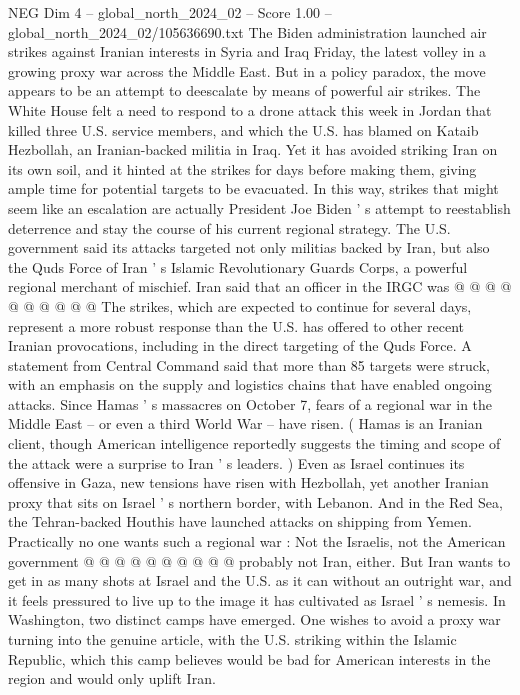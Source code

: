 \begin{textsample}{NEG Dim 4 – global\_north\_2024\_02 – Score 1.00 – global\_north\_2024\_02/105636690.txt}  \label{ex:f4_neg_287}
The Biden administration launched air strikes against Iranian interests in Syria and Iraq Friday, the latest volley in a growing proxy war across the Middle East.
But in a policy paradox, the move appears to be an attempt to deescalate by means of powerful air strikes.
The White House felt a need to respond to a drone attack this week in Jordan that killed three U.S. service members, and which the U.S. has blamed on Kataib Hezbollah, an Iranian-backed militia in Iraq.
Yet it has avoided striking Iran on its own soil, and it hinted at the strikes for days before making them, giving ample time for potential targets to be evacuated.
In this way, strikes that might seem like an escalation are actually President Joe Biden ' s attempt to reestablish deterrence and stay the course of his current regional strategy.
The U.S. government said its attacks targeted not only militias backed by Iran, but also the Quds Force of Iran ' s Islamic Revolutionary Guards Corps, a powerful regional merchant of mischief.
Iran said that an officer in the IRGC was @ @ @ @ @ @ @ @ @ @ The strikes, which are expected to continue for several days, represent a more robust response than the U.S. has offered to other recent Iranian provocations, including in the direct targeting of the Quds Force.
A statement from Central Command said that more than 85 targets were struck, with an emphasis on the supply and logistics chains that have enabled ongoing attacks.
Since Hamas ' s massacres on October 7, fears of a regional war in the Middle East -- or even a third World War -- have risen. ( Hamas is an Iranian client, though American intelligence reportedly suggests the timing and scope of the attack were a surprise to Iran ' s leaders. ) Even as Israel continues its offensive in Gaza, new tensions have risen with Hezbollah, yet another Iranian proxy that sits on Israel ' s northern border, with Lebanon.
And in the Red Sea, the Tehran-backed Houthis have launched attacks on shipping from Yemen.
Practically no one wants such a regional war : Not the Israelis, not the American government @ @ @ @ @ @ @ @ @ @ probably not Iran, either.
But Iran wants to get in as many shots at Israel and the U.S. as it can without an outright war, and it feels pressured to live up to the image it has cultivated as Israel ' s nemesis.
In Washington, two distinct camps have emerged.
One wishes to avoid a proxy war turning into the genuine article, with the U.S. striking within the Islamic Republic, which this camp believes would be bad for American interests in the region and would only uplift Iran.

\end{textsample}
